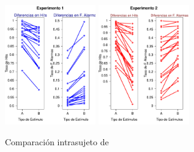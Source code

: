 \begin{figure}[th]
\centering
\includegraphics[width=0.35\textwidth]{Figures/Diff_Rate_E1} \includegraphics[width=0.35\textwidth]{Figures/Diff_Rate_E2}
\caption[Diferencias en Tasas (Comprobando diferencias entre condiciones)]{Comparación intrasujeto de}
\label{fig:Diff_Rate}
\end{figure}
